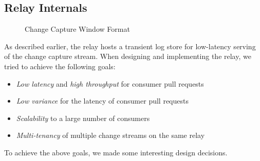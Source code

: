 \subsection{Relay Internals}
\begin{figure}
\centering
{}
\caption{Change Capture Window Format}
\label{fig:change-capture-window-format}
\end{figure}
As described earlier, the relay hosts a transient log store for low-latency serving of the change capture stream. When designing and implementing the relay, we tried to achieve the following goals:

\begin{itemize}

\item \emph{Low latency} and \emph{high throughput} for consumer pull requests
\item \emph{Low variance} for the latency of consumer pull requests
\item \emph{Scalability} to a large number of consumers
\item \emph{Multi-tenancy} of multiple change streams on the same relay

\end{itemize}

To achieve the above goals, we made some interesting design decisions. 

